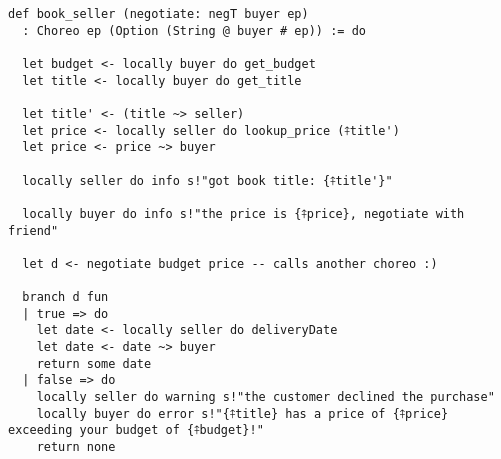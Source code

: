 \begin{lstlisting}[language=lean]
def book_seller (negotiate: negT buyer ep)
  : Choreo ep (Option (String @ buyer # ep)) := do

  let budget <- locally buyer do get_budget
  let title <- locally buyer do get_title

  let title' <- (title ~> seller)
  let price <- locally seller do lookup_price (⤉title')
  let price <- price ~> buyer

  locally seller do info s!"got book title: {⤉title'}"

  locally buyer do info s!"the price is {⤉price}, negotiate with friend"

  let d <- negotiate budget price -- calls another choreo :)

  branch d fun
  | true => do
    let date <- locally seller do deliveryDate
    let date <- date ~> buyer
    return some date
  | false => do
    locally seller do warning s!"the customer declined the purchase"
    locally buyer do error s!"{⤉title} has a price of {⤉price} exceeding your budget of {⤉budget}!"
    return none

\end{lstlisting}

